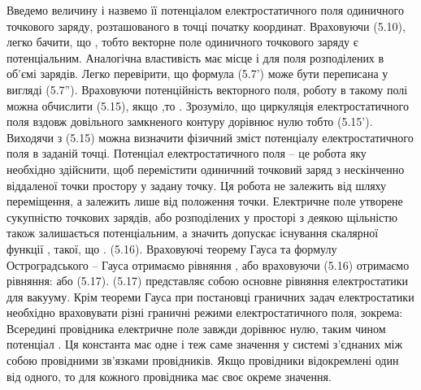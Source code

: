 Введемо величину  		  і назвемо її потенціалом електростатичного поля одиничного точкового заряду, розташованого в точці початку координат. Враховуючи (5.10), легко бачити, що  , тобто векторне поле одиничного точкового заряду є потенціальним. Аналогічна властивість має місце і для поля розподілених в об'ємі зарядів. 
Легко перевірити, що формула (5.7') може бути переписана у вигляді  							(5.7'').
Враховуючи потенційність векторного поля, роботу в такому полі можна обчислити 
 					(5.15), якщо  ,то  .
Зрозуміло, що  циркуляція  електростатичного поля вздовж довільного замкненого контуру дорівнює нулю тобто  				(5.15').
Виходячи з (5.15) можна визначити фізичний зміст потенціалу електростатичного поля в заданій точці. Потенціал електростатичного поля – це робота яку необхідно здійснити, щоб перемістити одиничний точковий заряд з нескінченно віддаленої точки простору у задану точку. Ця робота не залежить від шляху переміщення, а залежить лише від положення точки.
Електричне поле утворене сукупністю точкових зарядів, або розподілених у просторі з деякою щільністю також залишається потенціальним, а значить допускає існування скалярної функції  , такої, що  .		(5.16).
Враховуючі теорему Гауса та формулу Остроградського – Гауса отримаємо  рівняння  , або враховуючи (5.16) отримаємо  рівняння:
   або 	 						(5.17).
(5.17) представляє собою основне рівняння електростатики для вакууму.
Крім теореми Гауса при постановці граничних задач електростатики необхідно враховувати різні граничні режими електростатичного поля, зокрема:
Всередині провідника електричне поле   завжди дорівнює нулю, таким чином потенціал  . Ця константа має одне і теж саме значення у системі з'єднаних між собою провідними зв'язками провідників. Якщо провідники відокремлені один від одного, то   для кожного провідника має своє окреме значення.


